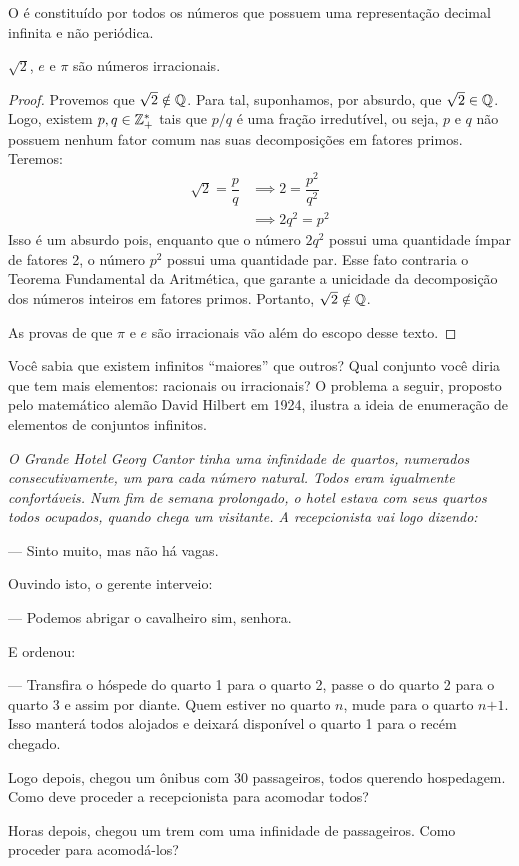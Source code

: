 \begin{definition}
O  é constituído por todos os números que possuem uma representação decimal infinita e não periódica.
\end{definition}

\begin{example}
$\sqrt 2$, $e$ e $\pi$ são números irracionais.
\end{example}

\begin{proof}
Provemos que $\sqrt2 \notin \mathbb{Q}$. Para tal, suponhamos, por absurdo, que $\sqrt2 \in \mathbb{Q}$. Logo, existem $p, q \in \mathbb{Z}^*_+$ tais que $p/q$ é uma fração irredutível, ou seja, $p$ e $q$ não possuem nenhum fator comum nas suas decomposições em fatores primos. Teremos:
%
\begin{equation*}
\begin{aligned}
\sqrt2 = \dfrac{p}{q} & \implies 2 = \dfrac{p^2}{q^2} \\
& \implies 2q^2 = p^2
\end{aligned}
\end{equation*}
%
Isso é um absurdo pois, enquanto que o número $2q^2$ possui uma quantidade ímpar de fatores 2, o número $p^2$ possui uma quantidade par. Esse fato contraria o Teorema Fundamental da Aritmética, que garante a unicidade da decomposição dos números inteiros em fatores primos. Portanto, $\sqrt2 \notin \mathbb{Q}$.

As provas de que $\pi$ e $e$ são irracionais vão além do escopo desse texto. 
\end{proof}

\noindent Você sabia que existem infinitos ``maiores'' que outros? Qual conjunto você diria que tem mais elementos: racionais ou irracionais? O problema a seguir, proposto pelo matemático alemão David Hilbert em 1924, ilustra a ideia de enumeração de elementos de conjuntos infinitos.

{\itshape O Grande Hotel Georg Cantor tinha uma infinidade de quartos, numerados consecutivamente, um para cada número natural. Todos eram igualmente confortáveis. Num fim de semana prolongado, o hotel estava com seus quartos todos ocupados, quando chega um visitante. A recepcionista vai logo dizendo: 

--- Sinto muito, mas não há vagas. 

Ouvindo isto, o gerente interveio: 

--- Podemos abrigar o cavalheiro sim, senhora. 

E ordenou:

--- Transfira o hóspede do quarto 1 para o quarto 2, passe o do quarto 2 para o quarto 3 e assim por diante. Quem estiver no quarto $n$, mude para o quarto $\textit{n+1}$. Isso manterá todos alojados e deixará disponível o quarto 1 para o recém chegado.

Logo depois, chegou um ônibus com 30 passageiros, todos querendo hospedagem. Como deve proceder a recepcionista para acomodar todos? 

Horas depois, chegou um trem com uma infinidade de passageiros. Como proceder para acomodá-los?}

